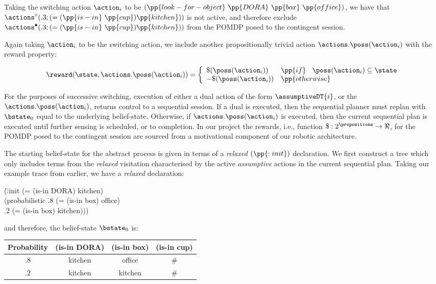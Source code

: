 \noindent Taking the switching action $\action_i$ to be
$(\pp{look-for-object}~\pp{DORA}~\pp{box}~\pp{office})$, we have that
$\actions^{\circ}(.3;(=(\pp{is-in}~\pp{cup})\pp{kitchen}))$ is not
active, and therefore exclude
$\actions^{\bullet}(.3;(=(\pp{is-in}~\pp{cup})\pp{kitchen}))$ from the
POMDP posed to the contingent session.

Again taking $\action_i$ to be the switching action, we include
another propositionally trivial action $\actions.\poss(\action_i)$
with the reward property:

\[
\reward(\state, \actions.\poss(\action_i)) = \bigg\{ \begin{array}{ll}
\$(\poss(\action_i)) & \pp{if}~\;\; \poss(\action_i) \subseteq \state \\
-\$(\poss(\action_i)) & \pp{otherwise} \\
\end{array}
\]

For the purposes of successive switching, execution of either a dual
action of the form $\assumptiveDT{i}$, or the
$\actions.\poss(\action_i)$, returns control to a sequential
session. If a dual is executed, then the sequential planner must
replan with $\bstate_0$ equal to the underlying
belief-state. Otherwise, if $\actions.\poss(\action_i)$ is executed,
then the current sequential plan is executed until further sensing is
scheduled, or to completion. In our project the rewards, i.e.,
function $\$:2^\propositions\to\Re$, for the POMDP posed to the
contingent session are sourced from a motivational component of our
robotic architecture.

The starting belief-state for the abstract process is given in terms
of a {\em relaxed} $(\pp{:init})$ declaration.  We first construct a
tree which only includes terms from the {\em relaxed} visitation
characterised by the active {\em assumptive} actions in the current
sequential plan. Taking our example trace from earlier, we have a {\em
relaxed} declaration:

\small
\begin{tabtt}
(\=:init (= (is-in DORA) kitchen) \+ \\
       (probabilistic \=.8 (= (is-in box) office)  \\
		      \>.2 (= (is-in box) kitchen))) \\
\end{tabtt}
\normalsize

\noindent and therefore, the belief-state $\bstate_0$ is:

\small
\begin{tabular}{cccc}
\hline
Probability & (is-in DORA)  & (is-in box)  & (is-in cup) \\
\hline
.8 & kitchen & office & \# \\
.2 & kitchen & kitchen & \# \\
\hline
\end{tabular}
\normalsize

